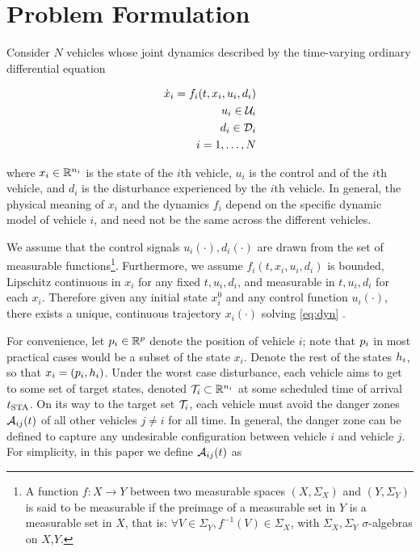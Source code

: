 \section{Problem Formulation \label{sec:formulation}}
Consider $N$ vehicles whose joint dynamics described by the time-varying ordinary differential equation

\begin{equation}
\label{eq:dyn}
\begin{aligned}
\dot{x}_i = f_i(t, x_i, u_i, d_i) \\
u_i \in \mathcal{U}_i \\
d_i \in \mathcal{D}_i \\
i = 1,\ldots, N
\end{aligned}
\end{equation}

where $x_i \in \mathbb{R}^{n_i}$ is the state of the $i$th vehicle, $u_i$ is the control and of the $i$th vehicle, and $d_i$ is the disturbance experienced by the $i$th vehicle. In general, the physical meaning of $x_i$ and the dynamics $f_i$ depend on the specific dynamic model of vehicle $i$, and need not be the same across the different vehicles. 

We assume that the control signals $u_i(\cdot), d_i(\cdot)$ are drawn from the set of measurable functions\footnote{
A function $f:X\to Y$ between two measurable spaces $(X,\Sigma_X)$ and $(Y,\Sigma_Y)$ is said to be measurable if the preimage of a measurable set in $Y$ is a measurable set in $X$, that is: $\forall V\in\Sigma_Y, f^{-1}(V)\in\Sigma_X$, with $\Sigma_X,\Sigma_Y$ $\sigma$-algebras on $X$,$Y$.}. Furthermore, we assume $f_i(t,x_i, u_i, d_i)$ is bounded, Lipschitz continuous in $x_i$ for any fixed $t, u_i, d_i$, and measurable in $t, u_i, d_i$ for each $x_i$. Therefore given any initial state $x_i^0$ and any control function $u_i(\cdot)$, there exists a unique, continuous trajectory $x_i(\cdot)$ solving \eqref{eq:dyn} \cite{Coddington55}.

For convenience, let $p_i \in \mathbb{R}^p$ denote the position of vehicle $i$; note that $p_i$ in most practical cases would be a subset of the state $x_i$. Denote the rest of the states $h_i$, so that $x_i = (p_i, h_i)$. Under the worst case disturbance, each vehicle aims to get to some set of target states, denoted $\mathcal{T}_i \subset \mathbb{R}^{n_i}$ at some scheduled time of arrival $t_\text{STA}$. On its way to the target set $\mathcal{T}_i$, each vehicle must avoid the danger zones $\mathcal{A}_{ij}(t)$ of all other vehicles $j\neq i$ for all time. In general, the danger zone can be defined to capture any undesirable configuration between vehicle $i$ and vehicle $j$. For simplicity, in this paper we define $\mathcal{A}_{ij}(t)$ as

